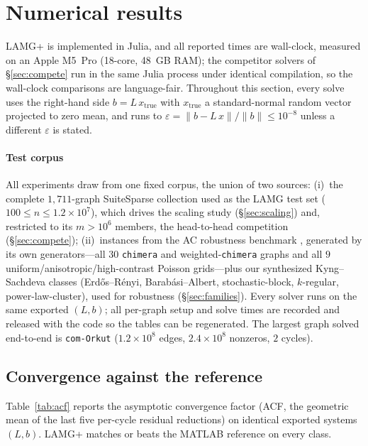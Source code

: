 \documentclass[review]{siamart220329}
\begin{document}
\section{Numerical results}\label{sec:results}
LAMG+ is implemented in Julia, and all reported times are wall-clock, measured on an Apple M5~Pro
(18-core, 48~GB RAM); the competitor solvers of \S\ref{sec:compete} run in the same Julia process
under identical compilation, so the wall-clock comparisons are language-fair.
Throughout this section, every solve uses the right-hand side $b=L\,x_{\mathrm{true}}$ with
$x_{\mathrm{true}}$ a standard-normal random vector projected to zero mean, and runs to
$\varepsilon=\|b-L\,x\|/\|b\|\le10^{-8}$ unless a different $\varepsilon$ is stated.

\paragraph{Test corpus} All experiments draw from one fixed corpus, the union of two sources:
(i)~the complete $1{,}711$-graph SuiteSparse collection used as the LAMG test set
($100\le n\le1.2\!\times\!10^7$), which drives the scaling study (\S\ref{sec:scaling}) and, restricted
to its $m>10^6$ members, the head-to-head competition (\S\ref{sec:compete});
(ii)~instances from the AC robustness benchmark \cite{gks2023}, generated by its
own generators---all $30$ \texttt{chimera} and weighted-\texttt{chimera} graphs and all $9$
uniform/anisotropic/high-contrast Poisson grids---plus our synthesized Kyng--Sachdeva classes
(Erd\H{o}s--R\'enyi, Barab\'asi--Albert, stochastic-block, $k$-regular, power-law-cluster), used for
robustness (\S\ref{sec:families}). Every solver runs on the same exported $(L,b)$; all per-graph setup and solve
times are recorded and released with the code \cite{lamgplus-code} so the tables can be regenerated. The largest graph
solved end-to-end is \texttt{com-Orkut} ($1.2\!\times\!10^8$ edges, $2.4\!\times\!10^8$ nonzeros,
$2$ cycles).

\subsection{Convergence against the reference}\label{sec:acf}
Table~\ref{tab:acf} reports the asymptotic convergence factor (ACF, the geometric mean of
the last five per-cycle residual reductions) on identical exported systems $(L,b)$. LAMG+
matches or beats the MATLAB reference on every class.
\end{document}
